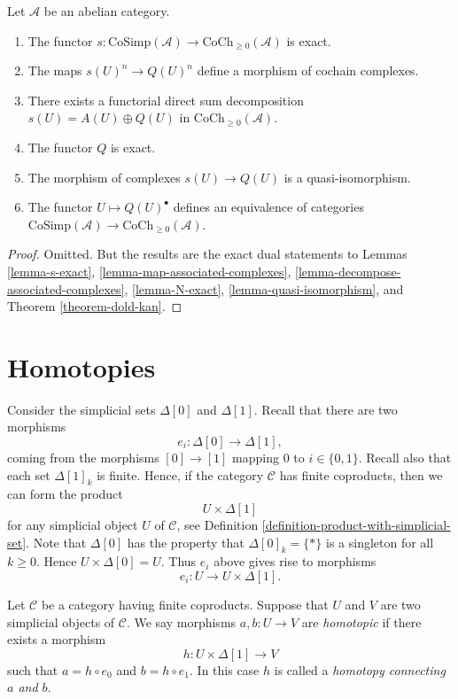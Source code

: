\begin{lemma}
\label{lemma-dual-dold-kan}
Let $\mathcal{A}$ be an abelian category.
\begin{enumerate}
\item The functor
$s : \text{CoSimp}(\mathcal{A}) \to \text{CoCh}_{\geq 0}(\mathcal{A})$
is exact.
\item The maps $s(U)^n \to Q(U)^n$ define a morphism
of cochain complexes.
\item There exists a functorial direct sum decomposition
$s(U) = A(U) \oplus Q(U)$ in $\text{CoCh}_{\geq 0}(\mathcal{A})$.
\item The functor $Q$ is exact.
\item The morphism of complexes $s(U) \to Q(U)$ is a quasi-isomorphism.
\item The functor $U \mapsto Q(U)^\bullet$ defines
an equivalence of categories
$\text{CoSimp}(\mathcal{A}) \to \text{CoCh}_{\geq 0}(\mathcal{A})$.
\end{enumerate}
\end{lemma}

\begin{proof}
Omitted. But the results are the exact dual statements to
Lemmas \ref{lemma-s-exact}, \ref{lemma-map-associated-complexes},
\ref{lemma-decompose-associated-complexes},
\ref{lemma-N-exact}, \ref{lemma-quasi-isomorphism}, and
Theorem \ref{theorem-dold-kan}.
\end{proof}

\section{Homotopies}
\label{section-homotopy}

\noindent
Consider the simplicial sets $\Delta[0]$ and $\Delta[1]$.
Recall that there are two morphisms
$$
e_i : \Delta[0] \longrightarrow \Delta[1],
$$
coming from the morphisms $[0] \to [1]$ mapping
$0$ to $i \in \{0, 1\}$. Recall also that each
set $\Delta[1]_k$ is finite. Hence, if the category
$\mathcal{C}$ has finite coproducts, then we can
form the product
$$
U \times \Delta[1]
$$
for any simplicial object $U$ of $\mathcal{C}$, see
Definition \ref{definition-product-with-simplicial-set}.
Note that $\Delta[0]$ has the property that $\Delta[0]_k = \{*\}$
is a singleton for all $k \geq 0$. Hence $U \times \Delta[0]
= U$. Thus $e_i$ above gives rise to morphisms
$$
e_i : U \to U \times \Delta[1].
$$

\begin{definition}
\label{definition-homotopy}
Let $\mathcal{C}$ be a category having finite coproducts.
Suppose that $U$ and $V$ are two simplicial objects
of $\mathcal{C}$.
We say morphisms $a, b : U \to V$ are {\it homotopic}
if there exists a morphism
$$
h : U \times \Delta[1] \longrightarrow V
$$
such that $a = h \circ e_0$ and $b = h \circ e_1$.
In this case $h$ is called a {\it homotopy connecting
$a$ and $b$}.
\end{definition}

